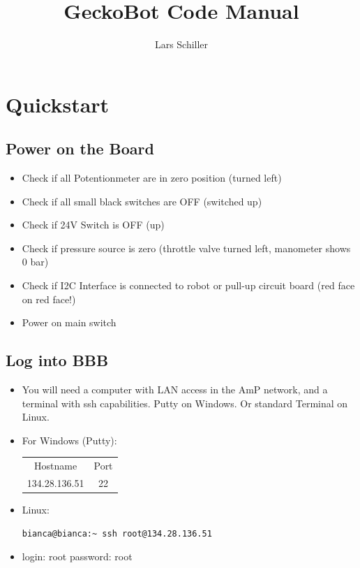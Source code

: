 \documentclass[
	fontsize=10pt
	paper=a4
]{scrartcl}
\author{Lars Schiller}
\title{GeckoBot Code Manual}
\begin{document}
\maketitle
\tableofcontents



\section{Quickstart}

\subsection{Power on the Board}

\begin{itemize}
\item Check if all Potentionmeter are in zero position (turned left)
\item Check if all small black switches are OFF (switched up)
\item Check if 24V Switch is OFF (up)
\item Check if pressure source is zero (throttle valve turned left, manometer shows 0 bar)
\item Check if I2C Interface is connected to robot or pull-up circuit board (red face on red face!)
\item Power on main switch



\end{itemize}

\subsection{Log into BBB}

\begin{itemize}

\item 	You will need a computer with LAN access in the AmP network, and a terminal with ssh capabilities. Putty on Windows. Or standard Terminal on Linux.

\item For Windows (Putty):
\begin{tabular}{cc}
Hostname & Port \\
134.28.136.51 & 22 \\
\end{tabular}

\item Linux:
\begin{lstlisting}
bianca@bianca:~ ssh root@134.28.136.51
\end{lstlisting}

\item login: root \qquad password: root

\end{itemize}
\end{document}
